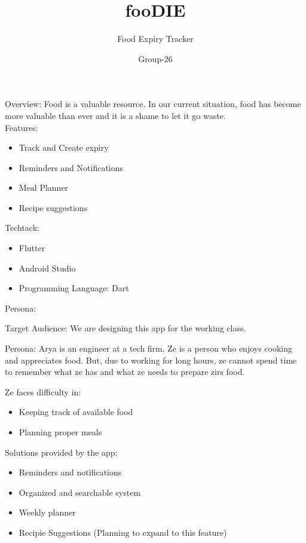 \documentclass[14pt]{beamer}
\title{fooDIE}
\subtitle{Food Expiry Tracker}
\author{Group-26}
\institute{SriPriya, Yaksha, Avantika}
\date{}
\begin{document}
\maketitle

\begin{frame}{Overview: }
Food is a valuable resource. In our current situation, food has become more valuable than ever and it is a shame to let it go waste.\\
	\alert {Features: }
	\begin{itemize}
			\pause
		\item Track and Create expiry
			\pause
		\item Reminders and Notifications
			\pause
		\item Meal Planner
			\pause
		\item Recipe suggestions
	\end{itemize}
\end{frame}

\begin{frame}[standout]
\alert {Techtack: }
	\begin{itemize}
			\pause
		\item Flutter
			\pause
		\item Android Studio
			\pause
		\item Programming Language: Dart
	\end{itemize}
\end{frame}

\begin{frame}{Persona: }
	\begin{exampleblock}{Target Audience: }
		We are designing this app for the working class.
	\end{exampleblock}

	\alert{Persona: }
	Arya is an engineer at a tech firm. Ze is a person who enjoys cooking and appreciates food. But, due to working for long hours, ze cannot spend time to remember what ze has and what ze needs to prepare zirs food.  
\end{frame}

\begin{frame}
	\alert {Ze faces difficulty in: }
	\begin{itemize}
			\pause
		\item Keeping track of available food
			\pause
		\item Planning proper meals
			\pause
	\end{itemize}

	\alert {Solutions provided by the app: }
	\begin{itemize}
			\pause
		\item Reminders and notifications
			\pause
		\item Organized and searchable system
			\pause
		\item Weekly planner
			\pause
		\item Recipie Suggestions (Planning to expand to this feature)
			\pause
	\end{itemize}
\end{frame}
\end{document}
